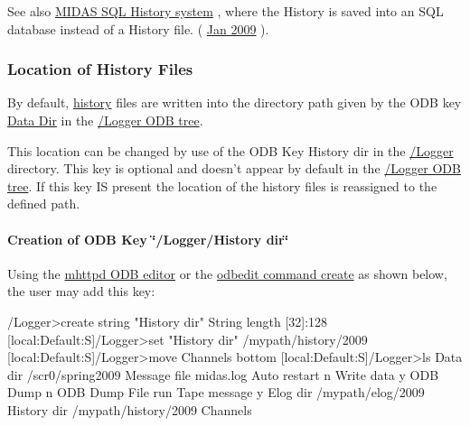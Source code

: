  See also \hyperlink{F_History_logging_F_History_sql_internal}{MIDAS SQL History system} , where the History is saved into an SQL database instead of a History file. ( \hyperlink{NDF_ndf_jan_2009}{Jan 2009} ). \hypertarget{F_History_logging_F_Logger_History_Files_Location}{}\subsubsection{Location of History Files}\label{F_History_logging_F_Logger_History_Files_Location}
\label{F_History_logging_F_Logger_History_Dir}
\hypertarget{F_History_logging_F_Logger_History_Dir}{}


\label{F_History_logging_idx_history_files_location}
\hypertarget{F_History_logging_idx_history_files_location}{}
 By default, \hyperlink{F_History_logging}{history} files are written into the directory path given by the ODB key \hyperlink{F_Logging_Data_F_Logger_Data_Dir}{Data Dir} in the \hyperlink{F_Logging_Data_F_Logger_tree}{/Logger ODB tree}.

This location can be changed by use of the ODB Key History dir in the \hyperlink{F_Logging_Data_F_Logger_tree_keys}{/Logger} directory. This key is optional and doesn't appear by default in the \hyperlink{F_Logging_Data_F_Logger_tree}{/Logger ODB tree}. If this key IS present the location of the history files is reassigned to the defined path.\hypertarget{F_History_logging_F_Logger_Create_History_Dir}{}\paragraph{Creation of ODB Key  \char`\"{}/Logger/History dir\char`\"{}}\label{F_History_logging_F_Logger_Create_History_Dir}
Using the \hyperlink{RC_mhttpd_ODB_page}{mhttpd ODB editor} or the \hyperlink{RC_odbedit_examples_RC_odbedit_cr}{odbedit command create} as shown below, the user may add this key: 
\begin{DoxyCode}
/Logger>create string "History dir"
String length [32]:128
[local:Default:S]/Logger>set "History dir" /mypath/history/2009
[local:Default:S]/Logger>move Channels bottom
[local:Default:S]/Logger>ls
  Data dir                        /scr0/spring2009
  Message file                    midas.log 
  Auto restart                     n
  Write data                      y
  ODB Dump                        n
  ODB Dump File                   run%
  Tape message                    y 
  Elog dir                        /mypath/elog/2009
  History dir                     /mypath/history/2009
  Channels
\end{DoxyCode}



